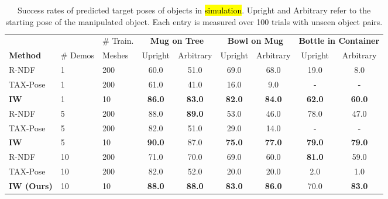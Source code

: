 \documentclass{article}
\begin{document}
\begin{table}[h]
    \centering
    \begin{tabular}{lllcccccc}
        \toprule
          & & \# Train. & \multicolumn{2}{c}{\textbf{Mug on Tree}} & \multicolumn{2}{c}{\textbf{Bowl on Mug}} & \multicolumn{2}{c}{\textbf{Bottle in Container}} \\
         \textbf{Method} & \# Demos & Meshes & Upright & Arbitrary & Upright & Arbitrary & Upright & Arbitrary \\
         \midrule
         R-NDF & 1 & 200 & 60.0 & 51.0 & 69.0 & 68.0 & 19.0 & 8.0 \\
         TAX-Pose & 1 & 200 & 61.0 & 41.0 & 16.0 & 9.0 & - & - \\
         \textbf{IW} & 1 & 10 & \textbf{86.0} & \textbf{83.0} & \textbf{82.0} & \textbf{84.0} & \textbf{62.0} & \textbf{60.0} \\
         \midrule
         R-NDF & 5 & 200 & 88.0 & \textbf{89.0} & 53.0 & 46.0 & 78.0 & 47.0 \\
         TAX-Pose & 5 & 200 & 82.0 & 51.0 & 29.0 & 14.0 & - & - \\
         \textbf{IW} & 5 & 10 & \textbf{90.0} & 87.0 & \textbf{75.0} & \textbf{77.0} & \textbf{79.0} & \textbf{79.0} \\
         \midrule
         R-NDF \cite{simeonov22se} & 10 & 200 & 71.0 & 70.0 & 69.0 & 60.0 & \textbf{81.0} & 59.0 \\
         TAX-Pose \cite{pan22taxpose} & 10 & 200 & 82.0 & 52.0 & 20.0 & 20.0 & 2.0 & 1.0 \\
         \textbf{IW (Ours)} & 10 & 10 & \textbf{88.0} & \textbf{88.0} & \textbf{83.0} & \textbf{86.0} & 70.0 & \textbf{83.0} \\
         \bottomrule
    \end{tabular}
    \caption{Success rates of predicted target poses of objects in \hl{simulation}. Upright and Arbitrary refer to the starting pose of the manipulated object. Each entry is measured over 100 trials with unseen object pairs.}
    \label{tab:simulation}
\end{table}
\end{document}
